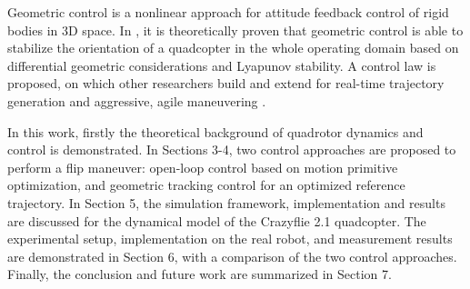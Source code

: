 Geometric control is a nonlinear approach for attitude feedback control of rigid bodies in 3D space. In \cite{lelemc2010}, it is theoretically proven that geometric control is able to stabilize the orientation of a quadcopter in the whole operating domain based on differential geometric considerations and Lyapunov stability. A control law is proposed, on which other researchers build and extend for real-time trajectory generation and aggressive, agile maneuvering \cite{turpinkumar2011, mellinger2011} .



In this work, firstly the theoretical background of quadrotor dynamics and control is demonstrated. In Sections 3-4, two control approaches are proposed to perform a flip maneuver:  open-loop control based on motion primitive optimization, and geometric tracking control for an optimized reference trajectory. In Section 5, the simulation framework, implementation and results are discussed for the dynamical model of the Crazyflie 2.1 quadcopter. The experimental setup, implementation on the real robot, and  measurement results are demonstrated in Section 6, with a comparison of the two control approaches. Finally, the conclusion and future work are summarized in Section 7.
